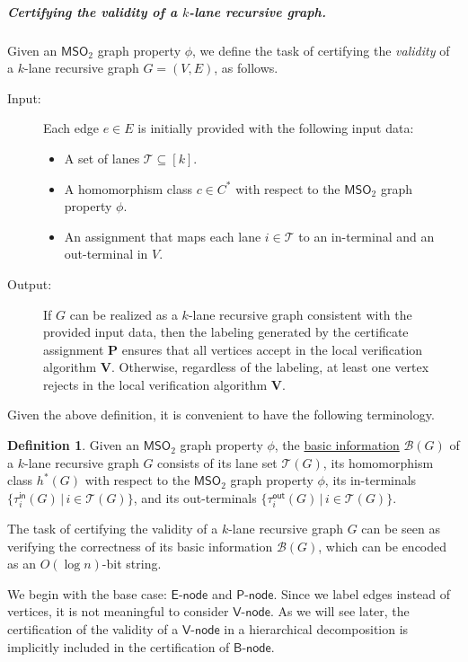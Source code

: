 \documentclass[11pt]{article}
\theoremstyle{definition}
\newtheorem{definition}[lemma]{Definition}
\theoremstyle{remark}
\newcommand{\MSO}{\mathsf{MSO}_2}
\newcommand{\tin}{\tau^{\mathsf{in}}}
\newcommand{\tout}{\tau^{\mathsf{out}}}
\newcommand{\vnode}{\mathsf{V}\text{-}\mathsf{node}}
\newcommand{\enode}{\mathsf{E}\text{-}\mathsf{node}}
\newcommand{\bnode}{\mathsf{B}\text{-}\mathsf{node}}
\newcommand{\pnode}{\mathsf{P}\text{-}\mathsf{node}}
\begin{document}
\subparagraph{Certifying the validity of a $k$-lane recursive graph.} Given an $\MSO$ graph property $\phi$, we define the task of certifying the \emph{validity} of a $k$-lane recursive graph $G=(V,E)$, as follows.
\begin{description}
    \item[Input:] Each edge $e \in E$ is initially provided with the following input data: 
    \begin{itemize}
        \item A set of lanes $\mathcal{T} \subseteq [k]$.
        \item A homomorphism class $c \in C^\ast$ with respect to the $\MSO$ graph property $\phi$.
        \item An assignment that maps each lane $i \in \mathcal{T}$ to an in-terminal and an out-terminal in $V$.
    \end{itemize}
    \item[Output:] If $G$ can be realized as a $k$-lane recursive graph consistent with the provided input data, then the labeling generated by the certificate assignment $\mathbf{P}$ ensures that all vertices accept in the local verification algorithm $\mathbf{V}$. Otherwise, regardless of the labeling, at least one vertex rejects in the local verification algorithm $\mathbf{V}$.
\end{description}

Given the above definition, it is convenient to have the following terminology.

\begin{definition}\label{def:basic}
Given an $\MSO$ graph property $\phi$, the \ul{basic information} $\mathcal{B}(G)$ of a $k$-lane recursive graph $G$ consists of its lane set $\mathcal{T}(G)$, its homomorphism class $h^\ast(G)$ with respect to the $\MSO$ graph property $\phi$, its in-terminals $\{\tin_i(G) \, | \, i\in\mathcal{T}(G)\}$, and its out-terminals  $\{\tout_i(G) \, | \, i\in\mathcal{T}(G)\}$.
\end{definition}

The task of certifying the validity of a $k$-lane recursive graph $G$ can be seen as verifying the correctness of its basic information $\mathcal{B}(G)$, which can be encoded as an $O(\log n)$-bit string.

  We begin with the base case: $\enode$ and $\pnode$. Since we label edges instead of vertices, it is not meaningful to consider $\vnode$. As we will see later, the certification of the validity of a $\vnode$ in a hierarchical decomposition is implicitly included in the certification of $\bnode$.
\end{document}
